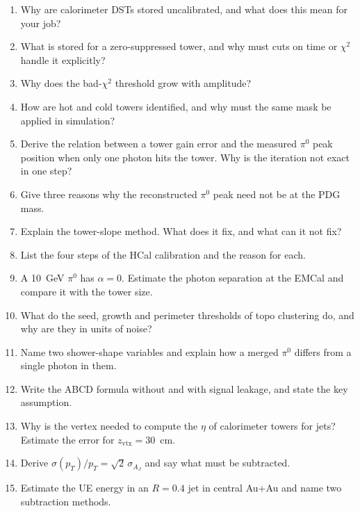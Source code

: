 \documentclass[11pt,letterpaper]{article}
\begin{document}
\begin{enumerate}[label=Q\arabic*.]
\item Why are calorimeter DSTs stored uncalibrated, and what does this mean for your job?
\item What is stored for a zero-suppressed tower, and why must cuts on time or $\chi^2$ handle it explicitly?
\item Why does the bad-$\chi^2$ threshold grow with amplitude?
\item How are hot and cold towers identified, and why must the same mask be applied in simulation?
\item Derive the relation between a tower gain error and the measured $\pi^0$ peak position when only one photon hits the tower. Why is the iteration not exact in one step?
\item Give three reasons why the reconstructed $\pi^0$ peak need not be at the PDG mass.
\item Explain the tower-slope method. What does it fix, and what can it not fix?
\item List the four steps of the HCal calibration and the reason for each.
\item A 10~GeV $\pi^0$ has $\alpha=0$. Estimate the photon separation at the EMCal and compare it with the tower size.
\item What do the seed, growth and perimeter thresholds of topo clustering do, and why are they in units of noise?
\item Name two shower-shape variables and explain how a merged $\pi^0$ differs from a single photon in them.
\item Write the ABCD formula without and with signal leakage, and state the key assumption.
\item Why is the vertex needed to compute the $\eta$ of calorimeter towers for jets? Estimate the error for $z_{\mathrm{vtx}}=30$~cm.
\item Derive $\sigma(p_T)/p_T=\sqrt2\,\sigma_{A_J}$ and say what must be subtracted.
\item Estimate the UE energy in an $R=0.4$ jet in central Au+Au and name two subtraction methods.
\end{enumerate}

\end{document}
